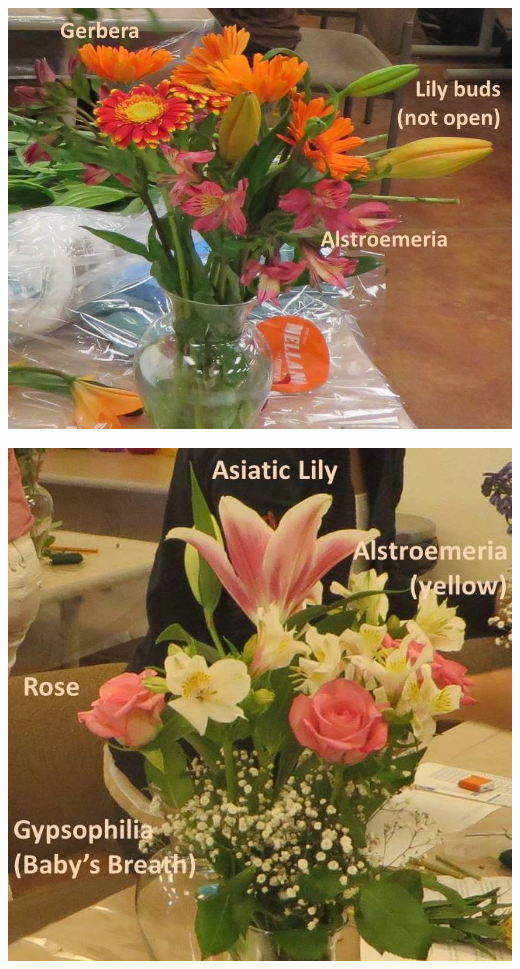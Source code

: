 \documentclass{article}
\begin{document}
\begin{center}
\includegraphics[width=0.9\textheight, angle=90]{../Arrangement1.jpg}
\end{center}
\newpage

\begin{center}
\includegraphics[width=0.9\textheight, angle=90]{../Arrangement2.jpg}
\end{center}
\newpage
\end{document}
